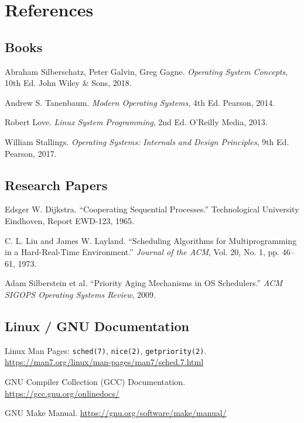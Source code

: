 \documentclass[12pt,a4paper]{report}
\begin{document}
\chapter{References}\label{ch9}

\section{Books}
\begin{enumerate}[leftmargin=1.8em, label={[\arabic*]}]
  \item Abraham Silberschatz, Peter Galvin, Greg Gagne. \textit{Operating System Concepts}, 10th Ed. John Wiley \& Sons, 2018.
  \item Andrew S. Tanenbaum. \textit{Modern Operating Systems}, 4th Ed. Pearson, 2014.
  \item Robert Love. \textit{Linux System Programming}, 2nd Ed. O'Reilly Media, 2013.
  \item William Stallings. \textit{Operating Systems: Internals and Design Principles}, 9th Ed. Pearson, 2017.
\end{enumerate}

\section{Research Papers}
\begin{enumerate}[leftmargin=1.8em, label={[\arabic*]}]
  \item Edsger W. Dijkstra. ``Cooperating Sequential Processes.'' Technological University Eindhoven, Report EWD-123, 1965.
  \item C. L. Liu and James W. Layland. ``Scheduling Algorithms for Multiprogramming in a Hard-Real-Time Environment.'' \textit{Journal of the ACM}, Vol. 20, No. 1, pp. 46--61, 1973.
  \item Adam Silberstein et al. ``Priority Aging Mechanisms in OS Schedulers.'' \textit{ACM SIGOPS Operating Systems Review}, 2009.
\end{enumerate}

\section{Linux / GNU Documentation}
\begin{enumerate}[leftmargin=1.8em, label={[\arabic*]}]
  \item Linux Man Pages: \texttt{sched(7)}, \texttt{nice(2)}, \texttt{getpriority(2)}. \url{https://man7.org/linux/man-pages/man7/sched.7.html}
  \item GNU Compiler Collection (GCC) Documentation. \url{https://gcc.gnu.org/onlinedocs/}
  \item GNU Make Manual. \url{https://gnu.org/software/make/manual/}
\end{enumerate}
\end{document}
